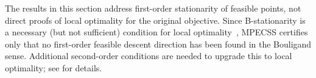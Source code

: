 The results in this section address first-order stationarity of feasible
points, not direct proofs of local optimality for the original
objective. Since B-stationarity is a necessary (but not sufficient)
condition for local optimality~\citep{LuoPangRalph1996,ScheelScholtes2000},
MPECSS certifies only that no first-order feasible descent direction has
been found in the Bouligand sense. Additional second-order conditions
are needed to upgrade this to local optimality; see
\cite{OutrataKocvaraZowe1998} for details.

